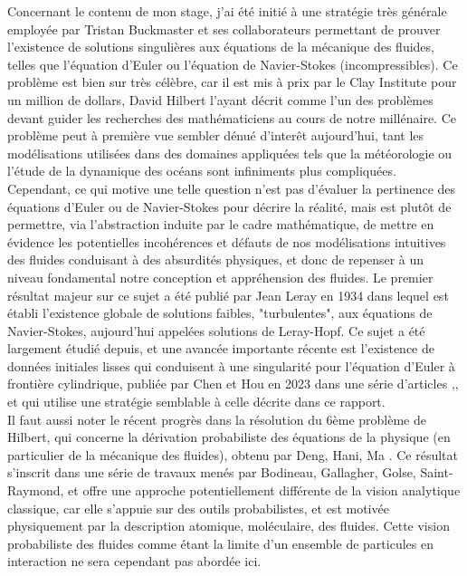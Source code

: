 \documentclass[11pt,a4paper]{article}
\begin{document}
\hspace*{2em} Concernant le contenu de mon stage, j'ai été initié à une stratégie très générale employée par Tristan Buckmaster et ses collaborateurs permettant de prouver l'existence de solutions singulières aux équations de la mécanique des fluides, telles que l'équation d'Euler ou l'équation de Navier-Stokes (incompressibles). Ce problème est bien sur très célèbre, car il est mis à prix par le Clay Institute pour un million de dollars, David Hilbert l'ayant décrit comme l'un des problèmes devant guider les recherches des mathématiciens au cours de notre millénaire. Ce problème peut à première vue sembler dénué d'interêt aujourd'hui, tant les modélisations utilisées dans des domaines appliquées tels que la météorologie ou l'étude de la dynamique des océans sont infiniments plus compliquées. Cependant, ce qui motive une telle question n'est pas d'évaluer la pertinence des équations d'Euler ou de Navier-Stokes pour décrire la réalité, mais est plutôt de permettre, via l'abstraction induite par le cadre mathématique, de mettre en évidence les potentielles incohérences et défauts de nos modélisations intuitives des fluides conduisant à des absurdités physiques, et donc de repenser à un niveau fondamental notre conception et appréhension des fluides. Le premier résultat majeur sur ce sujet a été publié par Jean Leray en 1934 \cite{leray1934} dans lequel est établi l'existence globale de solutions faibles, "turbulentes", aux équations de Navier-Stokes, aujourd'hui appelées solutions de Leray-Hopf. Ce sujet a été largement étudié depuis, et une avancée importante récente est l'existence de données initiales lisses qui conduisent à une singularité pour l'équation d'Euler à frontière cylindrique, publiée par Chen et Hou en 2023 dans une série d'articles \cite{chen_hou1},\cite{chen_hou2}, et qui utilise une stratégie semblable à celle décrite dans ce rapport. \\
\hspace*{2em} Il faut aussi noter le récent progrès dans la résolution du 6ème problème de Hilbert, qui concerne la dérivation probabiliste des équations de la physique (en particulier de la mécanique des fluides), obtenu par Deng, Hani, Ma \cite{deng_hani_ma_2025_hilbert6}. Ce résultat s'inscrit dans une série de travaux menés par Bodineau, Gallagher, Golse, Saint-Raymond, et offre une approche potentiellement différente de la vision analytique classique, car elle s'appuie sur des outils probabilistes, et est motivée physiquement par la description atomique, moléculaire, des fluides. Cette vision probabiliste des fluides comme étant la limite d'un ensemble de particules en interaction ne sera cependant pas abordée ici. \\
\end{document}
